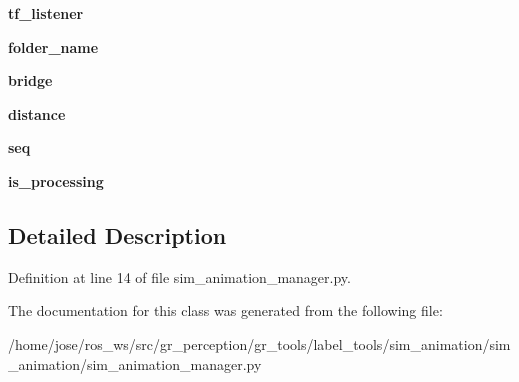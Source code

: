 \begin{DoxyCompactItemize}
{\bfseries tf\+\_\+listener}
\item 
\mbox{\label{classsim__animation_1_1sim__animation_1_1sim__animation__manager_1_1SimAnimationManager_a78cb7fb469f1b914861e32f0aaa31912}} 
{\bfseries folder\+\_\+name}
\item 
\mbox{\label{classsim__animation_1_1sim__animation_1_1sim__animation__manager_1_1SimAnimationManager_abcd8f7f0ae115277ee63e7455af9ada6}} 
{\bfseries bridge}
\item 
\mbox{\label{classsim__animation_1_1sim__animation_1_1sim__animation__manager_1_1SimAnimationManager_af82e0751c0842aa3553acf5859a417f8}} 
{\bfseries distance}
\item 
\mbox{\label{classsim__animation_1_1sim__animation_1_1sim__animation__manager_1_1SimAnimationManager_acd58461df5777ad4fdeabf47bfebd924}} 
{\bfseries seq}
\item 
\mbox{\label{classsim__animation_1_1sim__animation_1_1sim__animation__manager_1_1SimAnimationManager_a54c530c39297d958280bc5fda44c306c}} 
{\bfseries is\+\_\+processing}
\end{DoxyCompactItemize}


\subsection{Detailed Description}


Definition at line 14 of file sim\+\_\+animation\+\_\+manager.\+py.



The documentation for this class was generated from the following file\+:\begin{DoxyCompactItemize}
\item 
/home/jose/ros\+\_\+ws/src/gr\+\_\+perception/gr\+\_\+tools/label\+\_\+tools/sim\+\_\+animation/sim\+\_\+animation/sim\+\_\+animation\+\_\+manager.\+py\end{DoxyCompactItemize}
